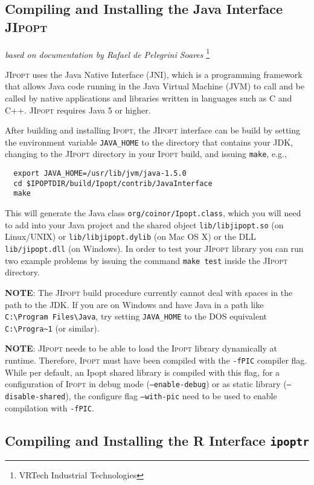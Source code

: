 \documentclass[10pt]{article}
\newcommand{\Ipopt}{\textsc{Ipopt}\xspace}
\newcommand{\JIpopt}{\textsc{JIpopt}\xspace}
\newcommand{\ipoptr}{\texttt{ipoptr}\xspace}
\begin{document}
\subsection{Compiling and Installing the Java Interface \JIpopt}  
\label{sec.jipopt.build}
\hfill \textit{based on documentation by Rafael de Pelegrini Soares}%
\footnote{VRTech Industrial Technologies}
\medskip

\JIpopt uses the Java Native Interface (JNI), which is a programming framework 
that allows Java code running in the Java Virtual Machine (JVM) to call and be 
called by native applications and libraries written in languages such as C and 
C++.
\JIpopt requires Java 5 or higher.

After building and installing \Ipopt, the \JIpopt interface can be build by 
setting the environment variable {\tt JAVA\_HOME} to the directory that 
contains your JDK, changing to the \JIpopt directory in your \Ipopt build, and 
issuing {\tt make}, e.g.,
\begin{verbatim}
  export JAVA_HOME=/usr/lib/jvm/java-1.5.0
  cd $IPOPTDIR/build/Ipopt/contrib/JavaInterface
  make
\end{verbatim}

This will generate the Java class {\tt org/coinor/Ipopt.class}, which you will 
need to add into your Java project and the shared object
{\tt lib/libjipopt.so} (on Linux/UNIX) or {\tt lib/libjipopt.dylib} (on Mac OS 
X) or the DLL {\tt lib/jipopt.dll} (on Windows).
In order to test your \JIpopt library you can run two example problems by 
issuing the command {\tt make test} inside the \JIpopt directory.

\textbf{NOTE}: The \JIpopt build procedure currently cannot deal with spaces 
in the path to the JDK. If you are on Windows and have Java in a path like 
\verb|C:\Program Files\Java|, try setting {\tt JAVA\_HOME} to the DOS 
equivalent \verb|C:\Progra~1| (or similar).

\textbf{NOTE}: \JIpopt needs to be able to load the \Ipopt library dynamically 
at runtime. Therefore, \Ipopt must have been compiled with the {\tt -fPIC} 
compiler flag. While per default, an Ipopt shared library is compiled with 
this flag, for a configuration of \Ipopt in debug mode ({\tt --enable-debug}) 
or as static library ({\tt --disable-shared}), the configure flag
{\tt --with-pic} need to be used to enable compilation with {\tt -fPIC}.

\subsection{Compiling and Installing the R Interface \ipoptr} 
\label{sec.ipoptr.build}
\end{document}
